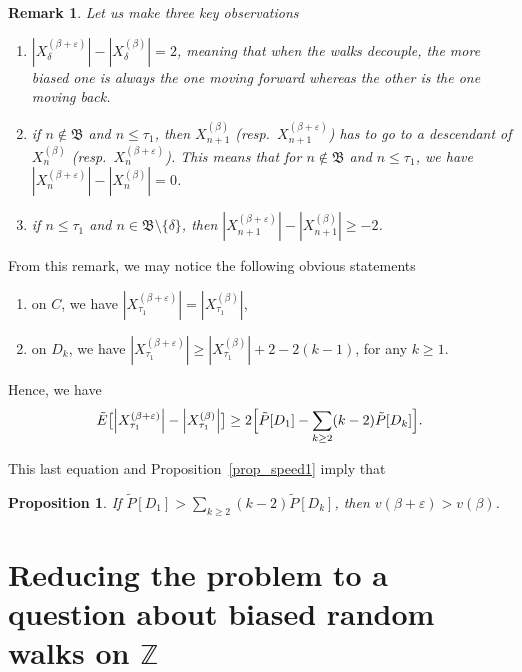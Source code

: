 \documentclass[12pt]{amsart}
\numberwithin{equation}{section}
\newtheorem{proposition}{Proposition}[section]
\newtheorem{remark}{Remark}[section]
\begin{document}
\begin{remark} Let us make three key observations
\begin{enumerate}
\item ${\left\vert {X_{\delta}^{(\beta+{\varepsilon})}}\right\vert}-{\left\vert {X_{\delta}^{(\beta)}}\right\vert}=2$, meaning that when the walks decouple, the more biased one is always the one moving forward whereas the other is the one moving back. 
\item if $n\notin \mathfrak{B}$ and $n\leq \tau_1$, then $X_{n+1}^{(\beta)}$ (resp.~$X_{n+1}^{(\beta+{\varepsilon})}$) has to go to a descendant of $X_{n}^{(\beta)}$ (resp.~$X_n^{(\beta+{\varepsilon})}$). This means that for $n\notin \mathfrak{B}$ and $n\leq \tau_1$, we have ${\left\vert {X_{n}^{(\beta+{\varepsilon})}}\right\vert}-{\left\vert {X_{n}^{(\beta)}}\right\vert}=0$.
\item if $n\leq \tau_1$ and $n\in \mathfrak{B}\setminus \{\delta\}$, then ${\left\vert {X_{n+1}^{(\beta+{\varepsilon})}}\right\vert}-{\left\vert {X_{n+1}^{(\beta)}}\right\vert}\geq -2$.
\end{enumerate}
\end{remark}

From this remark, we may notice the following obvious statements
\begin{enumerate}
\item on $C$, we have ${\left\vert {X^{(\beta+{\varepsilon})}_{\tau_1}}\right\vert}={\left\vert {X^{(\beta)}_{\tau_1}}\right\vert}$,
\item on $D_k$, we have ${\left\vert {X^{(\beta+{\varepsilon})}_{\tau_1}}\right\vert}\geq {\left\vert {X^{(\beta)}_{\tau_1}}\right\vert}+2-2(k-1)$, for any $k\geq 1$.
\end{enumerate}

Hence, we have
\begin{equation}\label{blabla}
\tilde{E}\bigl[{\left\vert {X_{\tau_1}^{(\beta+{\varepsilon})}}\right\vert}-{\left\vert {X_{\tau_1}^{(\beta)}}\right\vert}\bigr] 
\geq  2\Bigl[\tilde{P}[D_1]-\sum_{k\geq 2} (k-2) \tilde{P}[D_k]\Bigr] .
\end{equation}

This last equation and Proposition~\ref{prop_speed1} imply that
\begin{proposition}
\label{prop_speed2}
If $\tilde{P}[D_1]>\sum_{k\geq 2} (k-2)\tilde{P}[D_k]$, then $v(\beta+{\varepsilon})>v(\beta)$.
\end{proposition}

 
 \section{Reducing the problem to a question about biased random walks on ${\mathbb{Z}}$}
 
\end{document}
